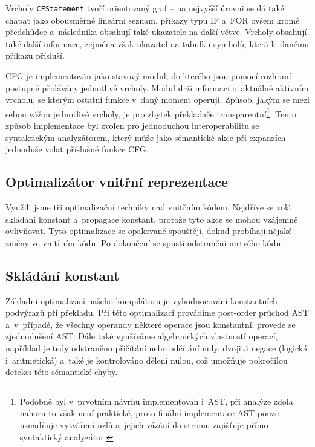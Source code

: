 \documentclass[11pt]{article}
\begin{document}
Vrcholy \texttt{CFStatement} tvoří orientovaný graf -- na nejvyšší úrovni se dá také chápat jako obousměrně lineární seznam, příkazy typu IF a~FOR ovšem kromě předchůdce a~následníka obsahují také ukazatele na další větve. Vrcholy obsahují také další informace, zejména však ukazatel na tabulku symbolů, která k~danému příkazu přísluší.

CFG je implementován jako stavový modul, do kterého jsou pomocí rozhraní postupně přidávány jednotlivé vrcholy. Modul drží informaci o~aktuálně aktivním vrcholu, se kterým ostatní funkce v~daný moment operují. Způsob, jakým se mezi sebou vážou jednotlivé vrcholy, je pro zbytek překladače transparentní\footnote{Podobně byl v~prvotním návrhu implementován i~AST, při analýze zdola nahoru to však není praktické, proto finální implementace AST pouze usnadňuje vytváření uzlů a~jejich vázání do stromu zajišťuje přímo syntaktický analyzátor.}. Tento způsob implementace byl zvolen pro jednoduchou interoperabilitu se syntaktickým analyzátorem, který může jako sémantické akce při expanzích jednoduše volat příslušné funkce CFG.

\subsection{Optimalizátor vnitřní reprezentace}
Využili jsme tři optimalizační techniky nad vnitřním kódem. Nejdříve se volá skládání konstant a~propagace konstant, protože tyto akce se mohou vzájemně ovlivňovat. Tyto optimalizace se opakovaně spouštějí, dokud probíhají nějaké změny ve vnitřním kódu. Po dokončení se spustí odstranění mrtvého kódu.

\subsection{Skládání konstant}
Základní optimalizací našeho kompilátoru je vyhodnocování konstantních podvýrazů při překladu. Při této optimalizaci provádíme post-order průchod AST a~v~případě, že všechny operandy některé operace jsou konstantní, provede se zjednodušení AST. Dále také využíváme algebraických vlastností operací, například je tedy odstraněno přičítání nebo odčítání nuly, dvojitá negace (logická i~aritmetická) a~také je kontrolováno dělení nulou, což umožňuje pokročilou detekci této sémantické chyby.
\end{document}

